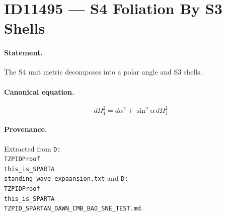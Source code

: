 \section*{ID11495 --- S4 Foliation By S3 Shells}

\paragraph{Statement.}
The S4 unit metric decomposes into a polar angle and S3 shells.

\paragraph{Canonical equation.}
\[
d\Omega_4^2=d\alpha^2+\sin^2\alpha\,d\Omega_3^2
\]

\paragraph{Provenance.}
Extracted from \texttt{D:\\TZPIDProof\\this\_is\_SPARTA\\standing\_wave\_expaansion.txt} and \texttt{D:\\TZPIDProof\\this\_is\_SPARTA\\TZPID\_SPARTAN\_DAWN\_CMB\_BAO\_SNE\_TEST.md}.
